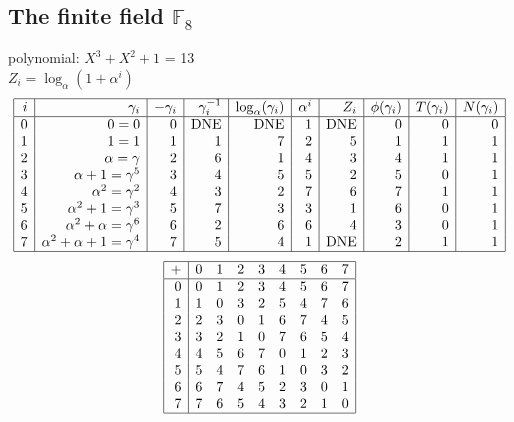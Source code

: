 \subsection*{The finite field ${\mathbb F}_{8}$}
\small
polynomial: $X^{3} + X^{2} + 1$ = 13\\
$Z_i = \log_\alpha (1 + \alpha^i)$\\
$$\begin{array}{|*{10}{r|}}
\hline
i & \gamma_i & -\gamma_i& \gamma_i^{-1}& \log_\alpha(\gamma_i)& \alpha^i& Z_i& \phi(\gamma_i) & T(\gamma_i) & N(\gamma_i) \\
\hline
  0 & 0 = 0 &0 & \mbox{DNE} & \mbox{DNE} &1 & \mbox{DNE} &0 &0 &0\\
  1 &   1 = 1 &1 &1 &7 &2 &5 &1 &1 &1\\
  2 & \alpha = \gamma  &2 &6 &1 &4 &3 &4 &1 &1\\
  3 & \alpha +   1 = \gamma^{5} &3 &4 &5 &5 &2 &5 &0 &1\\
  4 & \alpha^{2} = \gamma^{2} &4 &3 &2 &7 &6 &7 &1 &1\\
  5 & \alpha^{2} +   1 = \gamma^{3} &5 &7 &3 &3 &1 &6 &0 &1\\
  6 & \alpha^{2} + \alpha = \gamma^{6} &6 &2 &6 &6 &4 &3 &0 &1\\
  7 & \alpha^{2} + \alpha +   1 = \gamma^{4} &7 &5 &4 &1 & \mbox{DNE} &2 &1 &1\\
\hline
\end{array}
$$
$$
\begin{array}{|r|*{8}{r}|}
\hline
+  &         0 &         1 &         2 &         3 &         4 &         5 &         6 &         7\\
\hline
         0&         0&         1&         2&         3&         4&         5&         6&         7\\
         1&         1&         0&         3&         2&         5&         4&         7&         6\\
         2&         2&         3&         0&         1&         6&         7&         4&         5\\
         3&         3&         2&         1&         0&         7&         6&         5&         4\\
         4&         4&         5&         6&         7&         0&         1&         2&         3\\
         5&         5&         4&         7&         6&         1&         0&         3&         2\\
         6&         6&         7&         4&         5&         2&         3&         0&         1\\
         7&         7&         6&         5&         4&         3&         2&         1&         0\\
\hline
\end{array}
$$
